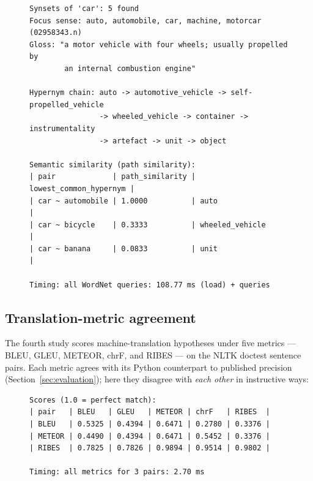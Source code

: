 \documentclass[smallextended]{svjour3}
\begin{document}
\begin{figure}[H]
\begin{lstlisting}[basicstyle=\ttfamily\scriptsize,caption={Captured output of \texttt{paper/usecases/wordnet\_query.ts} (abridged).},label={lst:wordnet}]
Synsets of 'car': 5 found
Focus sense: auto, automobile, car, machine, motorcar (02958343.n)
Gloss: "a motor vehicle with four wheels; usually propelled by
        an internal combustion engine"

Hypernym chain: auto -> automotive_vehicle -> self-propelled_vehicle
                -> wheeled_vehicle -> container -> instrumentality
                -> artefact -> unit -> object

Semantic similarity (path similarity):
| pair             | path_similarity | lowest_common_hypernym |
| car ~ automobile | 1.0000          | auto                   |
| car ~ bicycle    | 0.3333          | wheeled_vehicle        |
| car ~ banana     | 0.0833          | unit                   |

Timing: all WordNet queries: 108.77 ms (load) + queries
\end{lstlisting}
\end{figure}

\subsection{Translation-metric agreement}
\label{sec:uc-mt}

The fourth study scores machine-translation hypotheses under five metrics --- BLEU, GLEU, METEOR, chrF, and RIBES --- on the NLTK doctest sentence pairs. Each metric agrees with its Python counterpart to published precision (Section~\ref{sec:evaluation}); here they disagree with \emph{each other} in instructive ways:

\begin{figure}[H]
\begin{lstlisting}[basicstyle=\ttfamily\scriptsize,caption={Captured output of \texttt{paper/usecases/translate\_eval.ts} (abridged).},label={lst:mt}]
Scores (1.0 = perfect match):
| pair   | BLEU   | GLEU   | METEOR | chrF   | RIBES  |
| BLEU   | 0.5325 | 0.4394 | 0.6471 | 0.2780 | 0.3376 |
| METEOR | 0.4490 | 0.4394 | 0.6471 | 0.5452 | 0.3376 |
| RIBES  | 0.7825 | 0.7826 | 0.9894 | 0.9514 | 0.9802 |

Timing: all metrics for 3 pairs: 2.70 ms
\end{lstlisting}
\end{figure}
\end{document}
